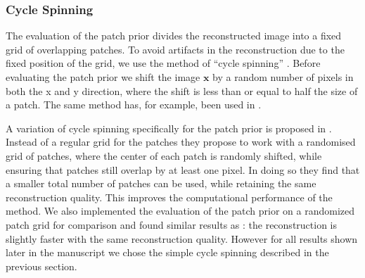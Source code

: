 \documentclass[twocolumn]{aastex631}
\DeclareMathOperator{\arcsinh}{arcsinh}
\newcommand{\todo}[1]{\textcolor{red}{TODO: #1}\PackageWarning{TODO:}{#1!}}
\begin{document}


    \subsubsection{Cycle Spinning}
    The evaluation of the patch prior divides the reconstructed image into a fixed grid of overlapping patches. To avoid artifacts in the reconstruction due to the fixed position of the grid, we use the method of \enquote{cycle spinning} \citep{Coifman1995}. Before evaluating the patch prior we shift the image $\mathbf{x}$ by a random number of pixels in both the x and y direction, where the shift is less than or equal to half the size of a patch. The same method has, for example, been used in \cite{Esch2004}.
    
    A variation of cycle spinning specifically for the patch prior is proposed in \cite{Parameswaran2018}. Instead of a regular grid for the patches they propose to work with a randomised grid of patches, where the center of each patch is randomly shifted, while ensuring that patches still overlap by at least one pixel. In doing so they find that a smaller total number of patches can be used, while retaining the same reconstruction quality. This improves the computational performance of the method. We also implemented the evaluation of the patch prior on a randomized patch grid for comparison and found similar results as \cite{Parameswaran2018}: the reconstruction is slightly faster with the same reconstruction quality. However for all results shown later in the manuscript we chose the simple cycle spinning described in the previous section.


\end{document}
